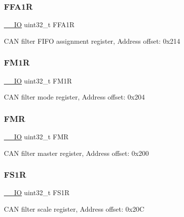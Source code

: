 \subsubsection{\texorpdfstring{F\+F\+A1R}{FFA1R}}
{\footnotesize\ttfamily \mbox{\hyperlink{core__sc300_8h_aec43007d9998a0a0e01faede4133d6be}{\+\_\+\+\_\+\+IO}} uint32\+\_\+t F\+F\+A1R}

C\+AN filter F\+I\+FO assignment register, Address offset\+: 0x214 \mbox{\label{struct_c_a_n___type_def_aaa6f4cf1f16aaa6d17ec6c410db76acf}} 
\subsubsection{\texorpdfstring{F\+M1R}{FM1R}}
{\footnotesize\ttfamily \mbox{\hyperlink{core__sc300_8h_aec43007d9998a0a0e01faede4133d6be}{\+\_\+\+\_\+\+IO}} uint32\+\_\+t F\+M1R}

C\+AN filter mode register, Address offset\+: 0x204 \mbox{\label{struct_c_a_n___type_def_a1cb734df34f6520a7204c4c70634ebba}} 
\subsubsection{\texorpdfstring{F\+MR}{FMR}}
{\footnotesize\ttfamily \mbox{\hyperlink{core__sc300_8h_aec43007d9998a0a0e01faede4133d6be}{\+\_\+\+\_\+\+IO}} uint32\+\_\+t F\+MR}

C\+AN filter master register, Address offset\+: 0x200 \mbox{\label{struct_c_a_n___type_def_aae0256ae42106ee7f87fc7e5bdb779d4}} 
\subsubsection{\texorpdfstring{F\+S1R}{FS1R}}
{\footnotesize\ttfamily \mbox{\hyperlink{core__sc300_8h_aec43007d9998a0a0e01faede4133d6be}{\+\_\+\+\_\+\+IO}} uint32\+\_\+t F\+S1R}

C\+AN filter scale register, Address offset\+: 0x20C \mbox{\label{struct_c_a_n___type_def_a6566f8cfbd1d8aa7e8db046aa35e77db}} 
